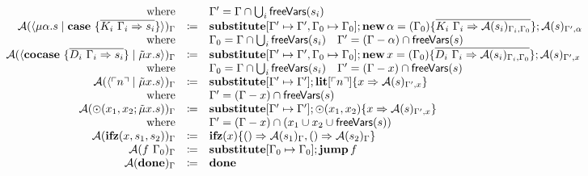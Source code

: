 \[\begin{array}{rcll}
    \text{where} &  & \Gamma' = \Gamma \cap \bigcup_i \mathsf{freeVars}(s_i) & \\
    \mathcal{A}(\langle \mu\alpha.s \mid \mathbf{case}\ \{ \overline{K_i\ \Gamma_i \Rightarrow s_i} \} \rangle)_{\Gamma} & \coloneq & \mathbf{substitute}[\Gamma' \mapsto \Gamma', \Gamma_0 \mapsto \Gamma_0]; \mathbf{new}\, \alpha = (\Gamma_0)\{ \overline{K_i\ \Gamma_i \Rightarrow \mathcal{A}(s_i)_{\Gamma_i, \Gamma_0}} \}; \mathcal{A}(s)_{\Gamma', \alpha} & \\
    \text{where} &  & \Gamma_0 = \Gamma \cap \bigcup_i \mathsf{freeVars}(s_i)  \quad  \Gamma' = (\Gamma - \alpha) \cap \mathsf{freeVars}(s) & \\
    \mathcal{A}(\langle \mathbf{cocase}\ \{ \overline{D_i\ \Gamma_i \Rightarrow s_i} \} \mid \tilde{\mu}x.s \rangle)_{\Gamma} & \coloneq & \mathbf{substitute}[\Gamma' \mapsto \Gamma', \Gamma_0 \mapsto \Gamma_0]; \mathbf{new}\, x = (\Gamma_0)\{ \overline{D_i\ \Gamma_i \Rightarrow \mathcal{A}(s_i)_{\Gamma_i, \Gamma_0}} \}; \mathcal{A}(s)_{\Gamma', x} & \\
    \text{where} &  & \Gamma_0 = \Gamma \cap \bigcup_i \mathsf{freeVars}(s_i)  \quad  \Gamma' = (\Gamma - x) \cap \mathsf{freeVars}(s) & \\
    \mathcal{A}(\langle \ulcorner n \urcorner \mid \tilde{\mu}x.s \rangle)_{\Gamma} & \coloneq & \mathbf{substitute}[\Gamma' \mapsto \Gamma']; \mathbf{lit}[\ulcorner n \urcorner]\{ x \Rightarrow \mathcal{A}(s)_{\Gamma', x} \} & \\
    \text{where} &  & \Gamma' = (\Gamma - x)\cap \mathsf{freeVars}(s) & \\
    \mathcal{A}(\odot(x_1, x_2; \tilde{\mu}x.s))_{\Gamma} & \coloneq & \mathbf{substitute}[\Gamma' \mapsto \Gamma']; \odot(x_1, x_2)\{ x \Rightarrow \mathcal{A}(s)_{\Gamma', x} \} & \\
    \text{where} &  & \Gamma' = (\Gamma - x) \cap (x_1 \cup x_2 \cup \mathsf{freeVars}(s)) & \\
    \mathcal{A}(\mathbf{ifz}(x, s_1, s_2))_{\Gamma}{} & \coloneq & \mathbf{ifz}(x)\{ () \Rightarrow \mathcal{A}(s_1)_{\Gamma}, () \Rightarrow \mathcal{A}(s_2)_{\Gamma} \} & \\
    \mathcal{A}(f\ \Gamma_0)_{\Gamma} & \coloneq & \mathbf{substitute}[\Gamma_0 \mapsto \Gamma_0]; \mathbf{jump}\, f & \\
    \mathcal{A}(\mathbf{done})_{\Gamma} & \coloneq & \mathbf{done} & \\
  \end{array}
\]
